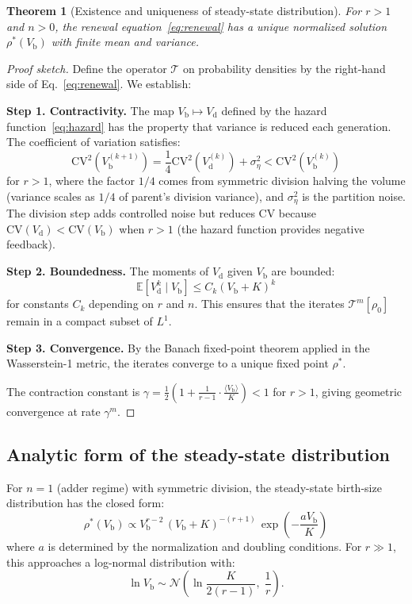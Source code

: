 \documentclass[11pt]{article}
\newcommand{\Vb}{V_{\mathrm{b}}}
\newcommand{\Vd}{V_{\mathrm{d}}}
\newcommand{\CV}{\mathrm{CV}}
\newcommand{\E}{\mathbb{E}}
\newtheorem{theorem}{Theorem}
\begin{document}
\begin{theorem}[Existence and uniqueness of steady-state distribution]
For $r > 1$ and $n > 0$, the renewal equation~\eqref{eq:renewal} has a unique normalized solution $\rho^*(\Vb)$ with finite mean and variance.
\end{theorem}

\begin{proof}[Proof sketch]
Define the operator $\mathcal{T}$ on probability densities by the right-hand side of Eq.~\eqref{eq:renewal}. We establish:

\textbf{Step 1. Contractivity.} The map $\Vb \mapsto \Vd$ defined by the hazard function~\eqref{eq:hazard} has the property that variance is reduced each generation. The coefficient of variation satisfies:
\begin{equation}
  \CV^2(\Vb^{(k+1)}) = \frac{1}{4}\CV^2(\Vd^{(k)}) + \sigma_\eta^2 < \CV^2(\Vb^{(k)})
\end{equation}
for $r > 1$, where the factor $1/4$ comes from symmetric division halving the volume (variance scales as $1/4$ of parent's division variance), and $\sigma_\eta^2$ is the partition noise. The division step adds controlled noise but reduces CV because $\CV(\Vd) < \CV(\Vb)$ when $r > 1$ (the hazard function provides negative feedback).

\textbf{Step 2. Boundedness.} The moments of $\Vd$ given $\Vb$ are bounded:
\begin{equation}
  \E[\Vd^k \mid \Vb] \leq C_k (\Vb + K)^k
\end{equation}
for constants $C_k$ depending on $r$ and $n$. This ensures that the iterates $\mathcal{T}^m[\rho_0]$ remain in a compact subset of $L^1$.

\textbf{Step 3. Convergence.} By the Banach fixed-point theorem applied in the Wasserstein-1 metric, the iterates converge to a unique fixed point $\rho^*$.

The contraction constant is $\gamma = \frac{1}{2}\left(1 + \frac{1}{r-1}\cdot\frac{\langle\Vb\rangle}{K}\right) < 1$ for $r > 1$, giving geometric convergence at rate $\gamma^m$.
\end{proof}

\subsection{Analytic form of the steady-state distribution}

For $n = 1$ (adder regime) with symmetric division, the steady-state birth-size distribution has the closed form:
\begin{equation}
  \rho^*(\Vb) \propto \Vb^{r-2}\, (\Vb + K)^{-(r+1)}\, \exp\!\left(-\frac{a\Vb}{K}\right)
  \label{eq:ss_dist}
\end{equation}
where $a$ is determined by the normalization and doubling conditions. For $r \gg 1$, this approaches a log-normal distribution with:
\begin{equation}
  \ln\Vb \sim \mathcal{N}\!\left(\ln\frac{K}{2(r-1)},\; \frac{1}{r}\right).
\end{equation}
\end{document}
